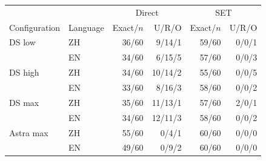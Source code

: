 \begin{tabular}{@{}llrrrr@{}}
\toprule
&&\multicolumn{2}{c}{Direct}&\multicolumn{2}{c}{SET}\\
Configuration & Language & Exact/$n$ & U/R/O & Exact/$n$ & U/R/O\\
\midrule
DS low & ZH & 36/60 & 9/14/1 & 59/60 & 0/0/1\\
 & EN & 34/60 & 6/15/5 & 57/60 & 0/0/3\\
\midrule
DS high & ZH & 34/60 & 10/14/2 & 55/60 & 0/0/5\\
 & EN & 33/60 & 8/16/3 & 58/60 & 0/0/2\\
\midrule
DS max & ZH & 35/60 & 11/13/1 & 57/60 & 2/0/1\\
 & EN & 34/60 & 12/11/3 & 58/60 & 0/0/2\\
\midrule
Astra max & ZH & 55/60 & 0/4/1 & 60/60 & 0/0/0\\
 & EN & 49/60 & 0/9/2 & 60/60 & 0/0/0\\
\bottomrule
\end{tabular}
